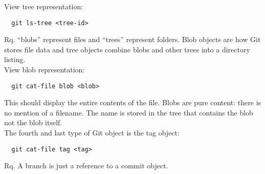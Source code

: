 \documentclass[french]{article}
\begin{document}
View tree representation:
\begin{verbatim}
  git ls-tree <tree-id>
\end{verbatim}
Rq. ``blobs'' represent files and ``trees'' represent folders. Blob objects are how Git stores file data and tree objects combine blobs and other trees into a directory listing.\\

View blob representation:
\begin{verbatim}
  git cat-file blob <blob>
\end{verbatim}
This should display the entire contents of the file. Blobs are pure content: there is no mention of a filename. The name is stored in the tree that contains the blob not the blob itself.\\

The fourth and last type of Git object is the tag object:
\begin{verbatim}
  git cat-file tag <tag>
\end{verbatim}

Rq. A branch is just a reference to a commit object.
\end{document}
